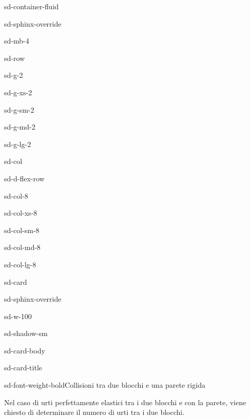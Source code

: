 \documentclass[letterpaper,10pt,italian]{jupyterBook}
\begin{document}
\begin{sphinxuseclass}{sd-container-fluid}
\begin{sphinxuseclass}{sd-sphinx-override}
\begin{sphinxuseclass}{sd-mb-4}
\begin{sphinxuseclass}{sd-row}
\begin{sphinxuseclass}{sd-g-2}
\begin{sphinxuseclass}{sd-g-xs-2}
\begin{sphinxuseclass}{sd-g-sm-2}
\begin{sphinxuseclass}{sd-g-md-2}
\begin{sphinxuseclass}{sd-g-lg-2}
\begin{sphinxuseclass}{sd-col}
\begin{sphinxuseclass}{sd-d-flex-row}
\begin{sphinxuseclass}{sd-col-8}
\begin{sphinxuseclass}{sd-col-xs-8}
\begin{sphinxuseclass}{sd-col-sm-8}
\begin{sphinxuseclass}{sd-col-md-8}
\begin{sphinxuseclass}{sd-col-lg-8}
\begin{sphinxuseclass}{sd-card}
\begin{sphinxuseclass}{sd-sphinx-override}
\begin{sphinxuseclass}{sd-w-100}
\begin{sphinxuseclass}{sd-shadow-sm}
\begin{sphinxuseclass}{sd-card-body}
\begin{sphinxuseclass}{sd-card-title}
\begin{sphinxuseclass}{sd-font-weight-bold}Collisioni tra due blocchi e una parete rigida
\end{sphinxuseclass}
\end{sphinxuseclass}
\sphinxAtStartPar
Nel caso di urti perfettamente elastici tra i due blocchi e con la parete, viene chiesto di determinare il numero di urti tra i due blocchi.


\end{sphinxuseclass}
\end{sphinxuseclass}
\end{sphinxuseclass}
\end{sphinxuseclass}
\end{sphinxuseclass}
\end{sphinxuseclass}
\end{sphinxuseclass}
\end{sphinxuseclass}
\end{sphinxuseclass}
\end{sphinxuseclass}
\end{sphinxuseclass}
\end{sphinxuseclass}
\end{sphinxuseclass}
\end{sphinxuseclass}
\end{sphinxuseclass}
\end{sphinxuseclass}
\end{sphinxuseclass}
\end{sphinxuseclass}
\end{sphinxuseclass}
\end{sphinxuseclass}
\end{sphinxuseclass}
\end{document}
